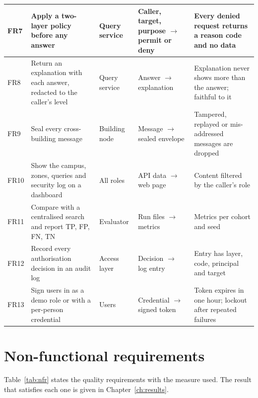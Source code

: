 \documentclass[12pt,a4paper,oneside]{report}
\begin{document}
{\begin{longtable}{|p{0.93cm}|p{3.75cm}|p{1.87cm}|p{3.19cm}|p{3.94cm}|}
FR7 & Apply a two-layer policy before any answer & Query service & Caller, target, purpose $\rightarrow$ permit or deny & Every denied request returns a reason code and no data\\\hline
FR8 & Return an explanation with each answer, redacted to the caller's level & Query service & Answer $\rightarrow$ explanation & Explanation never shows more than the answer; faithful to it\\\hline
FR9 & Seal every cross-building message & Building node & Message $\rightarrow$ sealed envelope & Tampered, replayed or mis-addressed messages are dropped\\\hline
FR10 & Show the campus, zones, queries and security log on a dashboard & All roles & API data $\rightarrow$ web page & Content filtered by the caller's role\\\hline
FR11 & Compare with a centralised search and report TP, FP, FN, TN & Evaluator & Run files $\rightarrow$ metrics & Metrics per cohort and seed\\\hline
FR12 & Record every authorisation decision in an audit log & Access layer & Decision $\rightarrow$ log entry & Entry has layer, code, principal and target\\\hline
FR13 & Sign users in as a demo role or with a per-person credential & Users & Credential $\rightarrow$ signed token & Token expires in one hour; lockout after repeated failures\\\hline
\end{longtable}}


\section{Non-functional requirements}
Table~\ref{tab:nfr} states the quality requirements with the measure used. The result that satisfies each one is given in Chapter~\ref{ch:results}.
\end{document}
